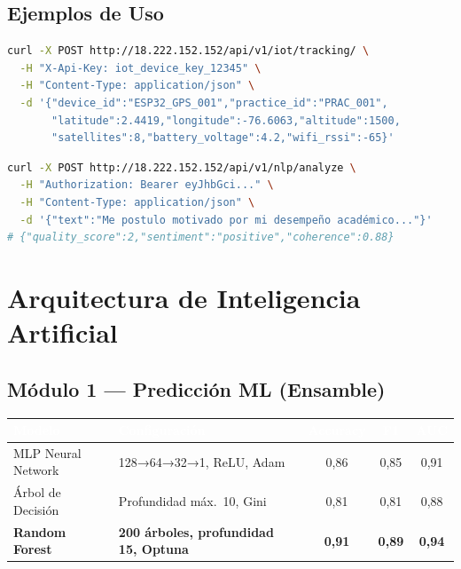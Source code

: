 \documentclass[12pt,a4paper,twoside]{report}
\begin{document}
\section{Ejemplos de Uso}
\begin{lstlisting}[language=bash,caption={POST /iot/tracking/ — Envío GPS desde ESP32}]
curl -X POST http://18.222.152.152/api/v1/iot/tracking/ \
  -H "X-Api-Key: iot_device_key_12345" \
  -H "Content-Type: application/json" \
  -d '{"device_id":"ESP32_GPS_001","practice_id":"PRAC_001",
       "latitude":2.4419,"longitude":-76.6063,"altitude":1500,
       "satellites":8,"battery_voltage":4.2,"wifi_rssi":-65}'
\end{lstlisting}

\begin{lstlisting}[language=bash,caption={POST /nlp/analyze — Análisis con DistilBERT}]
curl -X POST http://18.222.152.152/api/v1/nlp/analyze \
  -H "Authorization: Bearer eyJhbGci..." \
  -H "Content-Type: application/json" \
  -d '{"text":"Me postulo motivado por mi desempeño académico..."}'
# {"quality_score":2,"sentiment":"positive","coherence":0.88}
\end{lstlisting}

\chapter{Arquitectura de Inteligencia Artificial}

\section{Módulo 1 — Predicción ML (Ensamble)}

\begin{center}
\begin{tabularx}{\textwidth}{|l|X|c|c|c|}
\hline
\rowcolor{tableHdr}
\textcolor{white}{\textbf{Modelo}} & \textcolor{white}{\textbf{Configuración}} &
\textcolor{white}{\textbf{Accuracy}} & \textcolor{white}{\textbf{F1}} & \textcolor{white}{\textbf{AUC}} \\
\hline
\rowcolor{rowOdd}MLP Neural Network & 128→64→32→1, ReLU, Adam & 0,86 & 0,85 & 0,91 \\
\hline\rowcolor{rowEven}Árbol de Decisión & Profundidad máx.\ 10, Gini & 0,81 & 0,81 & 0,88 \\
\hline\rowcolor{rowOdd}\textbf{Random Forest} & \textbf{200 árboles, profundidad 15, Optuna} & \textbf{0,91} & \textbf{0,89} & \textbf{0,94} \\
\hline
\end{tabularx}
\end{center}
\end{document}
